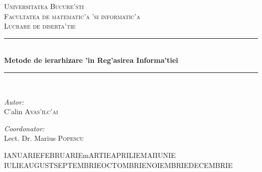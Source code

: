 
\newcommand{\HRule}{\rule{\linewidth}{0.5mm}}

\def\today{\space  \ifcase \month
\or IANUARIE\or FEBRUARIE\or mARTIE\or APRILIE\or MAI\or IUNIE\or
IULIE\or AUGUST\or SEPTEMBRIE\or OCTOMBRIE\or NOIEMBRIE\or DECEMBRIE \fi
\space  \number\year}

\begin{titlepage}
\begin{center}
  
\textsc{\LARGE Universitatea Bucure'sti}\\
\textsc{\LARGE Facultatea de matematic'a 'si informatic'a}\\[1.0cm]
 

\textsc{\Large Lucrare de diserta'tie}\\[3.0cm]
 
 
\HRule \\[0.5cm]
{ \huge \bfseries Metode de ierarhizare 'in Reg'asirea Informa'tiei}\\[0.4cm]
\HRule \\[4.5cm]
 
\begin{minipage}{0.4\textwidth}
\begin{flushleft} \large
\emph{Autor:}\\
C'alin \textsc{Avas'ilc'ai}
\end{flushleft}
\end{minipage}
\begin{minipage}{0.4\textwidth}
\begin{flushright} \large
\emph{Coordonator:} \\
Lect. Dr. Marius \textsc{Popescu}
\end{flushright}
\end{minipage}
 
\vfill
 
{\large \today}
 
\end{center}
\end{titlepage}
